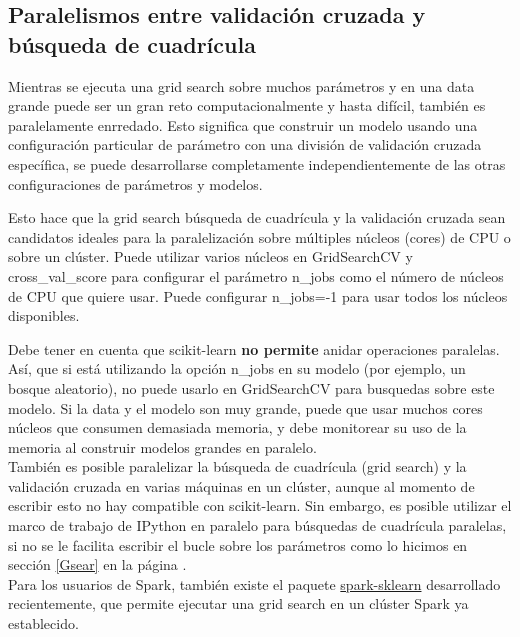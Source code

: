 {\subsection{Paralelismos entre validación cruzada y búsqueda de cuadrícula}
 
Mientras se ejecuta una grid search  sobre muchos parámetros y en una data grande 
puede ser un gran reto computacionalmente y hasta difícil, también es paralelamente enrredado. 
Esto significa que construir   un modelo usando una configuración  particular de parámetro con  una división de validación cruzada específica, se puede desarrollarse completamente independientemente de las otras configuraciones de parámetros y modelos. 

Esto hace que  la grid search  búsqueda de cuadrícula y la validación cruzada sean candidatos ideales para la paralelización sobre múltiples núcleos (cores) de CPU o sobre un clúster. Puede utilizar varios núcleos en  {\ttfamily GridSearchCV} y {\ttfamily cross\_val\_score} para configurar  el parámetro
  {\ttfamily n\_jobs} como el número de núcleos de CPU que quiere usar. Puede configurar 
  {\ttfamily n\_jobs=-1} para usar todos los núcleos disponibles.



Debe tener en cuenta que {\ttfamily scikit-learn}  {\bf no permite} anidar operaciones paralelas.
Así, que si está utilizando la opción {\ttfamily n\_jobs} en su modelo (por ejemplo, un bosque aleatorio),
no puede usarlo en {\ttfamily GridSearchCV} para busquedas sobre  este modelo. 
Si la  data y el modelo son muy grande, puede que usar muchos cores núcleos que  consumen  demasiada memoria,
y debe monitorear su uso de la memoria al construir modelos grandes en paralelo.\\

También es posible paralelizar la   búsqueda de cuadrícula (grid search) y la validación cruzada en varias
máquinas en un clúster, aunque al momento de escribir esto no hay  compatible con {\ttfamily scikit-learn}.
Sin embargo, es posible utilizar el marco de trabajo de IPython en paralelo  para   búsquedas de cuadrícula paralelas, si no se le facilita  escribir el bucle  sobre los parámetros como lo hicimos 
en sección \ref{Gsear} en la página  \pageref*{Gsear}.\\

Para los usuarios de {\ttfamily   Spark}, también existe el paquete   \href{https://github.com/databricks/spark-sklearn}{\textcolor{vino}{\ttfamily spark-sklearn}}  desarrollado recientemente, que permite ejecutar una  grid search  en un clúster Spark ya establecido.







}
